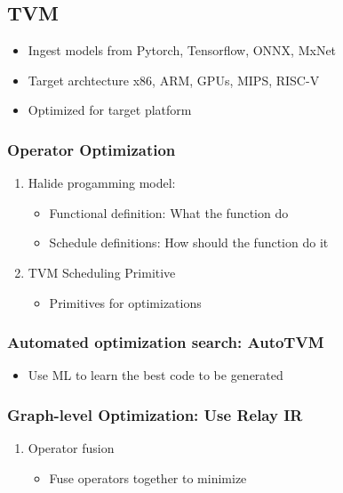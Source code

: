 \documentclass[11pt]{article}
\begin{document}
\subsection{TVM}
\label{sec:org7013c30}
\begin{itemize}
\item Ingest models from Pytorch, Tensorflow, ONNX, MxNet
\item Target archtecture x86, ARM, GPUs, MIPS, RISC-V
\item Optimized for target platform
\end{itemize}
\subsubsection{Operator Optimization}
\label{sec:org2d57dc9}
\begin{enumerate}
\item Halide progamming model:
\label{sec:orgb4d4ac1}
\begin{itemize}
\item Functional definition: What the function do
\item Schedule definitions: How should the function do it
\end{itemize}
\item TVM Scheduling Primitive
\label{sec:org67910cf}
\begin{itemize}
\item Primitives for optimizations
\end{itemize}
\end{enumerate}
\subsubsection{Automated optimization search: AutoTVM}
\label{sec:orgf3f4ec9}
\begin{itemize}
\item Use ML to learn the best code to be generated
\end{itemize}
\subsubsection{Graph-level Optimization: Use Relay IR}
\label{sec:orgc708230}
\begin{enumerate}
\item Operator fusion
\label{sec:org0020e2e}
\begin{itemize}
\item Fuse operators together to minimize
\end{itemize}
\end{enumerate}
\end{document}
